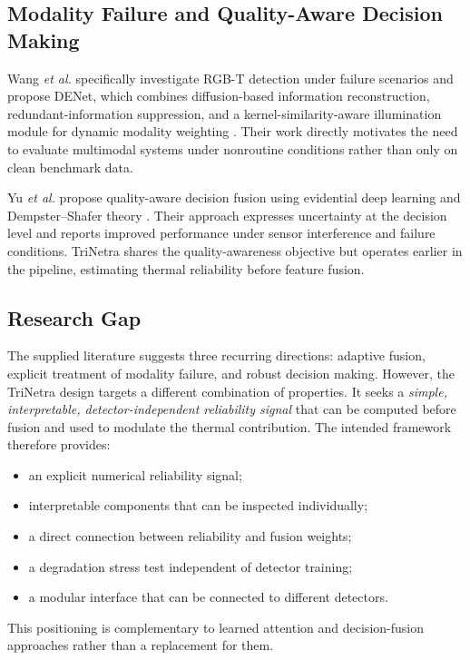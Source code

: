 \documentclass[conference]{IEEEtran}
\begin{document}
\subsection{Modality Failure and Quality-Aware Decision Making}

Wang \emph{et al.} specifically investigate RGB-T detection under failure scenarios and propose DENet, which combines diffusion-based information reconstruction, redundant-information suppression, and a kernel-similarity-aware illumination module for dynamic modality weighting \cite{denet}. Their work directly motivates the need to evaluate multimodal systems under nonroutine conditions rather than only on clean benchmark data.

Yu \emph{et al.} propose quality-aware decision fusion using evidential deep learning and Dempster--Shafer theory \cite{qdfm}. Their approach expresses uncertainty at the decision level and reports improved performance under sensor interference and failure conditions. TriNetra shares the quality-awareness objective but operates earlier in the pipeline, estimating thermal reliability before feature fusion.

\subsection{Research Gap}

The supplied literature suggests three recurring directions: adaptive fusion, explicit treatment of modality failure, and robust decision making. However, the TriNetra design targets a different combination of properties. It seeks a \emph{simple, interpretable, detector-independent reliability signal} that can be computed before fusion and used to modulate the thermal contribution. The intended framework therefore provides:

\begin{itemize}
    \item an explicit numerical reliability signal;
    \item interpretable components that can be inspected individually;
    \item a direct connection between reliability and fusion weights;
    \item a degradation stress test independent of detector training;
    \item a modular interface that can be connected to different detectors.
\end{itemize}

This positioning is complementary to learned attention and decision-fusion approaches rather than a replacement for them.
\end{document}
